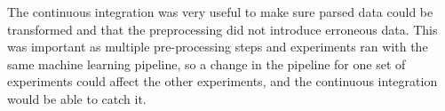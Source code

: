 \documentclass[Report.tex]{subfiles}
\begin{document}

The continuous integration was very useful to make sure parsed data could be transformed and that the preprocessing did not introduce erroneous data. This was important as multiple pre-processing steps and experiments ran with the same machine learning pipeline, so a change in the pipeline for one set of experiments could affect the other experiments, and the continuous integration would be able to catch it. 
\end{document}
